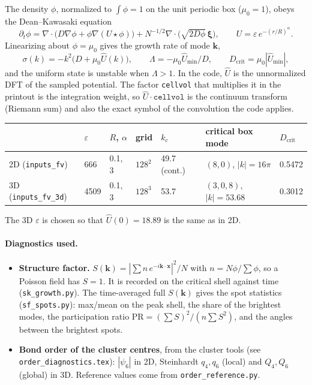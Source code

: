 \documentclass[11pt]{article}
\newcommand{\code}[1]{\texttt{#1}}
\newcommand{\Uh}{\hat U}
\newcommand{\Dc}{D_{\mathrm{crit}}}
\begin{document}
The density $\phi$, normalized to $\int\phi=1$ on the unit periodic box
($\mu_0=1$), obeys the Dean--Kawasaki equation
\begin{equation}
  \partial_t\phi = \nabla\cdot\bigl(D\nabla\phi + \phi\nabla(U\star\phi)\bigr)
     + N^{-1/2}\nabla\cdot\bigl(\sqrt{2D\phi}\,\boldsymbol\xi\bigr),
  \qquad U = \varepsilon\,e^{-(r/R)^\alpha} .
\end{equation}
Linearizing about $\phi=\mu_0$ gives the growth rate of mode $\mathbf k$,
\begin{equation}
  \sigma(k) = -k^2\bigl(D + \mu_0\Uh(k)\bigr), \qquad
  \Lambda = -\mu_0\Uh_{\min}/D, \qquad \Dc = \mu_0|\Uh_{\min}| ,
\end{equation}
and the uniform state is unstable when $\Lambda>1$. In the code, $\Uh$ is the
unnormalized DFT of the sampled potential. The factor \code{cellvol} that
multiplies it in the printout is the integration weight, so
$\Uh\cdot\code{cellvol}$ is the continuum transform (Riemann sum) and also
the exact symbol of the convolution the code applies.
\begin{center}
\begin{tabular}{@{}lllllll@{}}
\toprule
& $\varepsilon$ & $R$, $\alpha$ & grid & $k_c$ & critical box mode & $\Dc$ \\
\midrule
2D (\code{inputs\_fv}) & 666 & 0.1, 3 & $128^2$ & 49.7 (cont.) & $(8,0)$, $|k|=16\pi$ & 0.5472 \\
3D (\code{inputs\_fv\_3d}) & 4509 & 0.1, 3 & $128^3$ & 53.7 & $(3,0,8)$, $|k|=53.68$ & 0.3012 \\
\bottomrule
\end{tabular}
\end{center}
The 3D $\varepsilon$ is chosen so that $\Uh(0)=18.89$ is the same as in 2D.

\paragraph{Diagnostics used.}
\begin{itemize}
  \item \textbf{Structure factor.} $S(\mathbf k)=|\sum n\,e^{-i\mathbf k\cdot
        \mathbf x}|^2/N$ with $n=N\phi/\sum\phi$, so a Poisson field has $S=1$.
        It is recorded on the critical shell against time
        (\code{sk\_growth.py}). The time-averaged full $S(\mathbf k)$ gives the
        spot statistics (\code{sf\_spots.py}): max/mean on the peak shell, the
        share of the brightest modes, the participation ratio
        $\mathrm{PR}=(\sum S)^2/(n\sum S^2)$, and the angles between the
        brightest spots.
  \item \textbf{Bond order of the cluster centres}, from the cluster tools
        (see \code{order\_diagnostics.tex}): $|\psi_6|$ in 2D, Steinhardt
        $q_4,q_6$ (local) and $Q_4,Q_6$ (global) in 3D. Reference values come
        from \code{order\_reference.py}.
\end{itemize}
\end{document}
